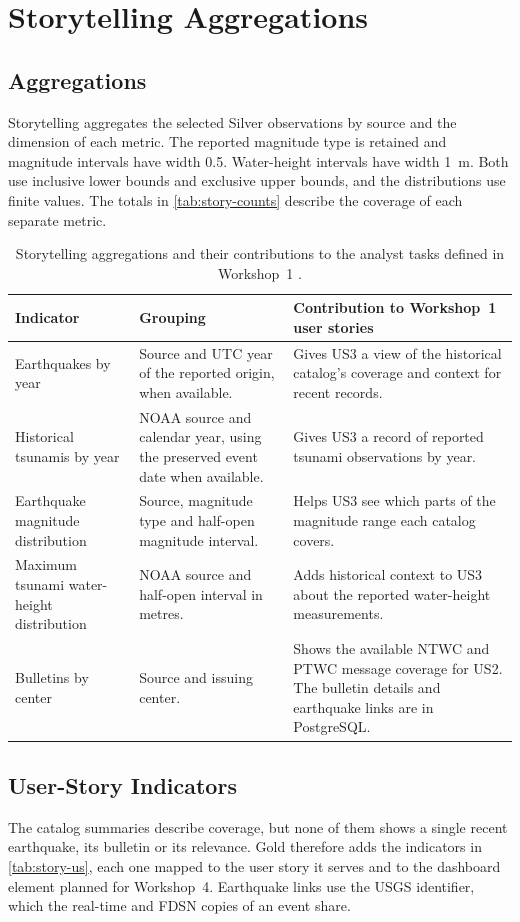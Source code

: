 \documentclass[a4paper,11pt,oneside]{book}
\begin{document}
\chapter{Storytelling Aggregations}
\label{ch:storytelling}
\section{Aggregations}
Storytelling aggregates the selected Silver observations by source and the dimension of each metric. The reported magnitude type is retained and magnitude intervals have width 0.5. Water-height intervals have width 1~m. Both use inclusive lower bounds and exclusive upper bounds, and the distributions use finite values. The totals in \cref{tab:story-counts} describe the coverage of each separate metric.

\begin{table}[htbp]
\centering
\small
\begin{tabularx}{\textwidth}{@{}L{3.1cm}YY@{}}
\toprule
Indicator & Grouping & Contribution to Workshop~1 user stories \\
\midrule
Earthquakes by year & Source and UTC year of the reported origin, when available. & Gives US3 a view of the historical catalog's coverage and context for recent records. \\
Historical tsunamis by year & NOAA source and calendar year, using the preserved event date when available. & Gives US3 a record of reported tsunami observations by year. \\
Earthquake magnitude distribution & Source, magnitude type and half-open magnitude interval. & Helps US3 see which parts of the magnitude range each catalog covers. \\
Maximum tsunami water-height distribution & NOAA source and half-open interval in metres. & Adds historical context to US3 about the reported water-height measurements. \\
Bulletins by center & Source and issuing center. & Shows the available NTWC and PTWC message coverage for US2. The bulletin details and earthquake links are in PostgreSQL. \\
\bottomrule
\end{tabularx}
\caption{Storytelling aggregations and their contributions to the analyst tasks defined in Workshop~1 \cite{workshop1}.}
\label{tab:story-purpose}
\end{table}

\section{User-Story Indicators}
\label{sec:story-us}
The catalog summaries describe coverage, but none of them shows a single recent earthquake, its bulletin or its relevance. Gold therefore adds the indicators in \cref{tab:story-us}, each one mapped to the user story it serves and to the dashboard element planned for Workshop~4. Earthquake links use the USGS identifier, which the real-time and FDSN copies of an event share.
\end{document}
